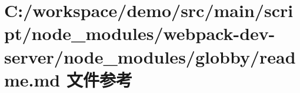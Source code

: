 \hypertarget{node__modules_2webpack-dev-server_2node__modules_2globby_2_r_e_a_d_m_e_8md}{}\section{C\+:/workspace/demo/src/main/script/node\+\_\+modules/webpack-\/dev-\/server/node\+\_\+modules/globby/readme.md 文件参考}
\label{node__modules_2webpack-dev-server_2node__modules_2globby_2_r_e_a_d_m_e_8md}
